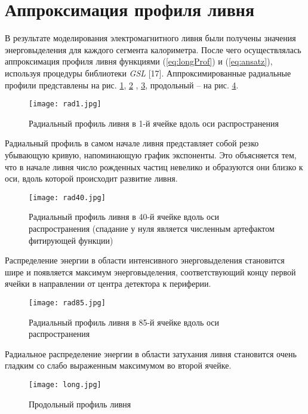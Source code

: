 \newpage
\section{Аппроксимация профиля ливня}  \label{chap7}  

В результате моделирования электромагнитного ливня были получены значения энерговыделения для каждого сегмента калориметра. После чего осуществлялась аппроксимация профиля ливня функциями (\ref{eq:longProf}) и (\ref{eq:ansatz}), используя процедуры библиотеки \textit{GSL} [17]. Аппроксимированные радиальные профили представлены на рис. \ref{fig:rad1}, \ref{fig:rad40} , \ref{fig:rad85}, продольный -- на рис. \ref{fig:longProf}.

\begin{figure}[H]
    \centering
    \texttt{[image: rad1.jpg]}
    \caption{Радиальный профиль ливня в 1-й ячейке вдоль оси распространения}
    \label{fig:rad1}
\end{figure}

Радиальный профиль в самом начале ливня представляет собой резко убывающую кривую, напоминающую график экспоненты. Это объясняется тем, что в начале ливня число рожденных частиц невелико и образуются они близко к оси, вдоль которой происходит развитие ливня.

\begin{figure}[H]
    \centering
    \texttt{[image: rad40.jpg]}
    \caption{ Радиальный профиль ливня в 40-й ячейке вдоль оси распространения (спадание у нуля является численным артефактом фитирующей функции)}
    \label{fig:rad40}
\end{figure}

Распределение энергии в области интенсивного энерговыделения становится шире и появляется максимум энерговыделения, соответствующий концу первой ячейки в направлении от центра детектора к периферии.

\begin{figure}[H]
    \centering
    \texttt{[image: rad85.jpg]}
    \caption{Радиальный профиль ливня в 85-й ячейке вдоль оси распространения}
    \label{fig:rad85}
\end{figure}

Радиальное распределение энергии в области затухания ливня становится очень гладким со слабо выраженным максимумом во второй ячейке.

\begin{figure}[H]
    \centering
    \texttt{[image: long.jpg]}
    \caption{Продольный профиль ливня}
    \label{fig:longProf}
\end{figure}


